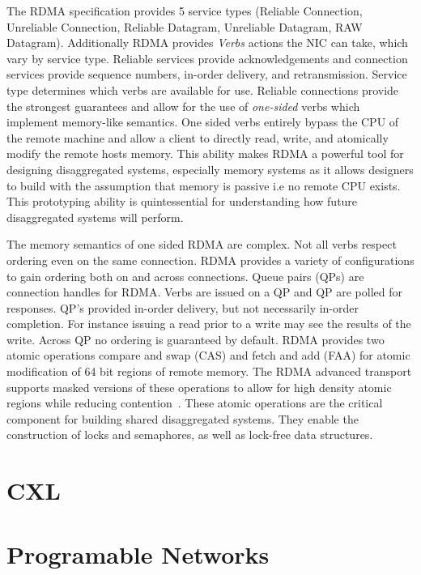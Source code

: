 \documentclass[12pt]{ucsddissertation}
\begin{document}
The RDMA specification provides 5 service types (Reliable Connection, Unreliable Connection,
Reliable Datagram, Unreliable Datagram, RAW Datagram). Additionally RDMA provides \textit{Verbs}
actions the NIC can take, which vary by service type. Reliable services provide acknowledgements and
connection services provide sequence numbers, in-order delivery, and retransmission. Service type
determines which verbs are available for use. Reliable connections provide the strongest guarantees
and allow for the use of \textit{one-sided} verbs which implement memory-like semantics. One sided
verbs entirely bypass the CPU of the remote machine and allow a client to directly read, write, and
atomically modify the remote hosts memory. This ability makes RDMA a powerful tool for designing
disaggregated systems, especially memory systems as it allows designers to build with the assumption
that memory is passive i.e no remote CPU exists. This prototyping ability is quintessential for
understanding how future disaggregated systems will perform.

The memory semantics of one sided RDMA are complex. Not all verbs respect ordering even on the same
connection. RDMA provides a variety of configurations to gain ordering both on and across
connections. Queue pairs (QPs) are connection handles for RDMA. Verbs are issued on a QP and QP are
polled for responses. QP's provided in-order delivery, but not necessarily in-order completion. For
instance issuing a read prior to a write may see the results of the write. Across QP no ordering is
guaranteed by default. RDMA provides two atomic operations compare and swap (CAS) and fetch and add
(FAA) for atomic modification of 64 bit regions of remote memory. The RDMA advanced transport
supports masked versions of these operations to allow for high density atomic regions while reducing
contention~\cite{rdma-masked-cas}. These atomic operations are the critical component for building
shared disaggregated systems. They enable the construction of locks and semaphores, as well as
lock-free data structures.

\section{CXL}


\section{Programable Networks}
\end{document}
